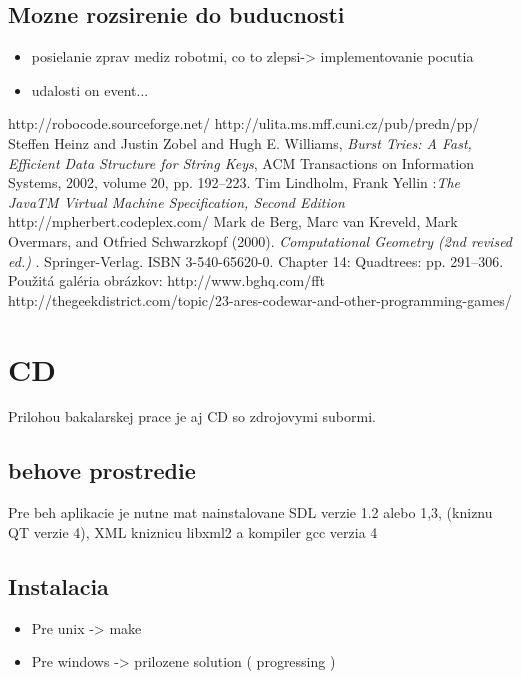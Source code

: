 \documentclass[12pt,notitlepage]{report}
\begin{document}
\section{Mozne rozsirenie do buducnosti}
\begin{itemize}
\item posielanie zprav mediz robotmi, co to zlepsi-> implementovanie pocutia
\item udalosti on event...
\end{itemize}
\tableofcontents
{}
\begin{thebibliography}{99}
 http://robocode.sourceforge.net/
 http://ulita.ms.mff.cuni.cz/pub/predn/pp/
Steffen Heinz and Justin Zobel and Hugh E. Williams,
    \emph{Burst Tries: A Fast, Efficient Data Structure for String Keys},
    ACM Transactions on Information Systems, 2002,
    volume 20, pp. 192--223.
 Tim Lindholm, Frank Yellin :\emph{The JavaTM Virtual Machine Specification, Second Edition}
http://mpherbert.codeplex.com/
   Mark de Berg, Marc van Kreveld, Mark Overmars, and Otfried Schwarzkopf (2000). \emph{ Computational Geometry (2nd revised ed.) }. Springer-Verlag. ISBN 3-540-65620-0.  Chapter 14: Quadtrees: pp. 291–306.
 Použitá galéria obrázkov: http://www.bghq.com/fft 
 http://thegeekdistrict.com/topic/23-ares-codewar-and-other-programming-games/
\end{thebibliography}
\appendix
\chapter{CD}
Prilohou bakalarskej prace je aj CD so zdrojovymi subormi.
\section{behove prostredie}
Pre beh aplikacie je nutne mat nainstalovane SDL verzie 1.2 alebo 1,3, (kniznu QT verzie 4), XML kniznicu libxml2 a kompiler gcc verzia 4
\section{Instalacia}
\begin{itemize}
\item Pre unix -> make
\item Pre windows -> prilozene solution ( progressing )
\end{itemize}
\end{document}
